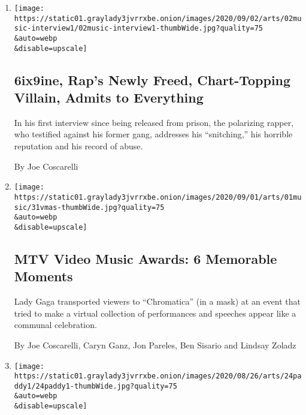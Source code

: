 \begin{enumerate}
\def\labelenumi{\arabic{enumi}.}
\item
  \href{/2020/09/02/arts/music/6ix9ine-interview.html}{}

  \texttt{[image: https://static01.graylady3jvrrxbe.onion/images/2020/09/02/arts/02music-interview1/02music-interview1-thumbWide.jpg?quality=75\\\&auto=webp\\\&disable=upscale]}

  \hypertarget{6ix9ine-raps-newly-freed-chart-topping-villain-admits-to-everything}{%
  \subsection{6ix9ine, Rap's Newly Freed, Chart-Topping Villain, Admits
  to
  Everything}\label{6ix9ine-raps-newly-freed-chart-topping-villain-admits-to-everything}}

  In his first interview since being released from prison, the
  polarizing rapper, who testified against his former gang, addresses
  his ``snitching,'' his horrible reputation and his record of abuse.

  By Joe Coscarelli
\item
  \href{/2020/08/31/arts/music/mtv-vmas.html}{}

  \texttt{[image: https://static01.graylady3jvrrxbe.onion/images/2020/09/01/arts/01music/31vmas-thumbWide.jpg?quality=75\\\&auto=webp\\\&disable=upscale]}

  \hypertarget{mtv-video-music-awards-6-memorable-moments}{%
  \subsection{MTV Video Music Awards: 6 Memorable
  Moments}\label{mtv-video-music-awards-6-memorable-moments}}

  Lady Gaga transported viewers to ``Chromatica'' (in a mask) at an
  event that tried to make a virtual collection of performances and
  speeches appear like a communal celebration.

  By Joe Coscarelli, Caryn Ganz, Jon Pareles, Ben Sisario and Lindsay
  Zoladz
\item
  \href{/2020/08/25/arts/music/paddy-duke-yusuf-hawkins.html}{}

  \texttt{[image: https://static01.graylady3jvrrxbe.onion/images/2020/08/26/arts/24paddy1/24paddy1-thumbWide.jpg?quality=75\\\&auto=webp\\\&disable=upscale]}

  \hypertarget{hot-97-fires-rap-radio-veteran-for-ties-to-yusuf-hawkins-killing}{%
}
\end{enumerate}
